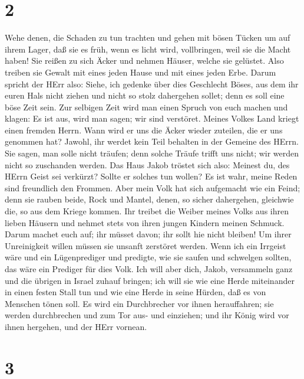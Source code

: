 \hypertarget{section-1}{%
\section{2}\label{section-1}}

 Wehe denen, die Schaden zu tun trachten und gehen mit bösen
Tücken um auf ihrem Lager, daß sie es früh, wenn es licht wird,
vollbringen, weil sie die Macht haben!  Sie reißen zu sich
Äcker und nehmen Häuser, welche sie gelüstet. Also treiben sie Gewalt
mit eines jeden Hause und mit eines jeden Erbe.  Darum
spricht der HErr also: Siehe, ich gedenke über dies Geschlecht Böses,
aus dem ihr euren Hals nicht ziehen und nicht so stolz dahergehen
sollet; denn es soll eine böse Zeit sein.  Zur selbigen Zeit
wird man einen Spruch von euch machen und klagen: Es ist aus, wird man
sagen; wir sind verstöret. Meines Volkes Land kriegt einen fremden
Herrn. Wann wird er uns die Äcker wieder zuteilen, die er uns genommen
hat?  Jawohl, ihr werdet kein Teil behalten in der Gemeine
des HErrn.  Sie sagen, man solle nicht träufen; denn solche
Träufe trifft uns nicht; wir werden nicht so zuschanden werden.
 Das Haus Jakob tröstet sich also: Meinest du, des HErrn
Geist sei verkürzt? Sollte er solches tun wollen? Es ist wahr, meine
Reden sind freundlich den Frommen.  Aber mein Volk hat sich
aufgemacht wie ein Feind; denn sie rauben beide, Rock und Mantel, denen,
so sicher dahergehen, gleichwie die, so aus dem Kriege kommen.
 Ihr treibet die Weiber meines Volks aus ihren lieben
Häusern und nehmet stets von ihren jungen Kindern meinen Schmuck.
 Darum machet euch auf; ihr müsset davon; ihr sollt hie
nicht bleiben! Um ihrer Unreinigkeit willen müssen sie unsanft zerstöret
werden.  Wenn ich ein Irrgeist wäre und ein Lügenprediger
und predigte, wie sie saufen und schwelgen sollten, das wäre ein
Prediger für dies Volk.  Ich will aber dich, Jakob,
versammeln ganz und die übrigen in Israel zuhauf bringen; ich will sie
wie eine Herde miteinander in einen festen Stall tun und wie eine Herde
in seine Hürden, daß es von Menschen tönen soll.  Es wird
ein Durchbrecher vor ihnen herauffahren; sie werden durchbrechen und zum
Tor aus- und einziehen; und ihr König wird vor ihnen hergehen, und der
HErr vornean.

\hypertarget{section-2}{%
\section{3}\label{section-2}}

